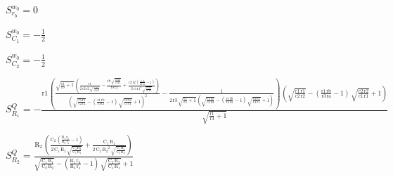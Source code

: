 \documentclass[../tc_tpfinal_main.tex]{subfiles}
\begin{document}
$S^{w_0}_{r_b} = 0$\par

$S^{w_0}_{C_1} = - \frac{1}{2}$\par

$S^{w_0}_{C_2} = - \frac{1}{2}$\par

$S^{Q}_{R_1} = -\frac{\mathrm{r1}\, \left(\frac{\sqrt{\frac{\mathrm{r1}}{\mathrm{r3}} + 1}\, \left(\frac{\mathrm{c1}}{2\, \mathrm{c2}\, \mathrm{r2}\, \sqrt{\frac{\mathrm{c1}\, \mathrm{r1}}{\mathrm{c2}\, \mathrm{r2}}}} - \frac{\mathrm{rb}\, \sqrt{\frac{\mathrm{c2}\, \mathrm{r2}}{\mathrm{c1}\, \mathrm{r1}}}}{\mathrm{r3}\, \mathrm{ra}} + \frac{\mathrm{c2}\, \mathrm{r2}\, \left(\frac{\mathrm{r1}\, \mathrm{rb}}{\mathrm{r3}\, \mathrm{ra}} - 1\right)}{2\, \mathrm{c1}\, {\mathrm{r1}}^2\, \sqrt{\frac{\mathrm{c2}\, \mathrm{r2}}{\mathrm{c1}\, \mathrm{r1}}}}\right)}{{\left(\sqrt{\frac{\mathrm{c1}\, \mathrm{r1}}{\mathrm{c2}\, \mathrm{r2}}} - \left(\frac{\mathrm{r1}\, \mathrm{rb}}{\mathrm{r3}\, \mathrm{ra}} - 1\right)\, \sqrt{\frac{\mathrm{c2}\, \mathrm{r2}}{\mathrm{c1}\, \mathrm{r1}}} + 1\right)}^2} - \frac{1}{2\, \mathrm{r3}\, \sqrt{\frac{\mathrm{r1}}{\mathrm{r3}} + 1}\, \left(\sqrt{\frac{\mathrm{c1}\, \mathrm{r1}}{\mathrm{c2}\, \mathrm{r2}}} - \left(\frac{\mathrm{r1}\, \mathrm{rb}}{\mathrm{r3}\, \mathrm{ra}} - 1\right)\, \sqrt{\frac{\mathrm{c2}\, \mathrm{r2}}{\mathrm{c1}\, \mathrm{r1}}} + 1\right)}\right)\, \left(\sqrt{\frac{\mathrm{c1}\, \mathrm{r1}}{\mathrm{c2}\, \mathrm{r2}}} - \left(\frac{\mathrm{r1}\, \mathrm{rb}}{\mathrm{r3}\, \mathrm{ra}} - 1\right)\, \sqrt{\frac{\mathrm{c2}\, \mathrm{r2}}{\mathrm{c1}\, \mathrm{r1}}} + 1\right)}{\sqrt{\frac{\mathrm{r1}}{\mathrm{r3}} + 1}}$\par

$S^{Q}_{R_2} = \frac{\mathrm{R_2}\, \left(\frac{\mathrm{C_2}\, \left(\frac{\mathrm{R_1}\, \mathrm{r_b}}{\mathrm{R_3}\, \mathrm{r_a}} - 1\right)}{2\, \mathrm{C_1}\, \mathrm{R_1}\, \sqrt{\frac{\mathrm{C_2}\, \mathrm{R_2}}{\mathrm{C_1}\, \mathrm{R_1}}}} + \frac{\mathrm{C_1}\, \mathrm{R_1}}{2\, \mathrm{C_2}\, {\mathrm{R_2}}^2\, \sqrt{\frac{\mathrm{C_1}\, \mathrm{R_1}}{\mathrm{C_2}\, \mathrm{R_2}}}}\right)}{\sqrt{\frac{\mathrm{C_1}\, \mathrm{R_1}}{\mathrm{C_2}\, \mathrm{R_2}}} - \left(\frac{\mathrm{R_1}\, \mathrm{r_b}}{\mathrm{R_3}\, \mathrm{r_a}} - 1\right)\, \sqrt{\frac{\mathrm{C_2}\, \mathrm{R_2}}{\mathrm{C_1}\, \mathrm{R_1}}} + 1}$\par
\end{document}
